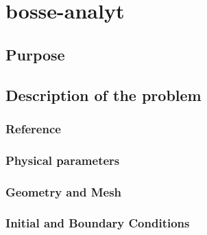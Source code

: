 \chapter{bosse-analyt}
%

%
\section{Purpose}
%

%
\section{Description of the problem}
%

%
%
\subsection{Reference}
%

%
%
\subsection{Physical parameters}
%

%
%
\subsection{Geometry and Mesh}
%

%
%
\subsection{Initial and Boundary Conditions}
%

%
%
